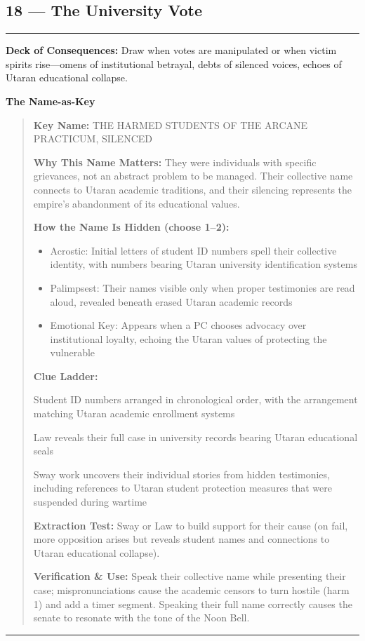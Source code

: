 \documentclass[18pt, letterpaper, twoside]{article}
\newenvironment{floorbox}[1]{%
    \begin{center}
    \begin{minipage}{0.95\textwidth}
    \subsection*{#1}
    \vspace{-0.5em}
    \rule{\textwidth}{0.5pt}
    \vspace{0.5em}
}{%
    \vspace{0.5em}
    \rule{\textwidth}{0.5pt}
    \end{minipage}
    \end{center}
}
\newenvironment{gmnote}[1]{%
    \vspace{0.5em}
    \noindent\textbf{#1}
    \begin{quote}
}{%
    \end{quote}
    \vspace{0.5em}
}
\newcommand{\deckdraw}[1]{\noindent\textbf{Deck of Consequences:} #1\par}
\newcommand{\keyname}[1]{\noindent\textbf{Key Name:} #1\par}
\newcommand{\nameimportance}[1]{\noindent\textbf{Why This Name Matters:} #1\par}
\begin{document}
\begin{floorbox}{18 --- The University Vote}
\deckdraw{Draw when votes are manipulated or when victim spirits rise---omens of institutional betrayal, debts of silenced voices, echoes of Utaran educational collapse.}

\begin{gmnote}{The Name-as-Key}
\keyname{THE HARMED STUDENTS OF THE ARCANE PRACTICUM, SILENCED}
\nameimportance{They were individuals with specific grievances, not an abstract problem to be managed. Their collective name connects to Utaran academic traditions, and their silencing represents the empire's abandonment of its educational values.}

\textbf{How the Name Is Hidden (choose 1--2):}
\begin{itemize}[leftmargin=*]
    \item Acrostic: Initial letters of student ID numbers spell their collective identity, with numbers bearing Utaran university identification systems
    \item Palimpsest: Their names visible only when proper testimonies are read aloud, revealed beneath erased Utaran academic records
    \item Emotional Key: Appears when a PC chooses advocacy over institutional loyalty, echoing the Utaran values of protecting the vulnerable
\end{itemize}

\textbf{Clue Ladder:}
\begin{description}[leftmargin=*, style=unboxed]
    \item[Gentle Nudge:] Student ID numbers arranged in chronological order, with the arrangement matching Utaran academic enrollment systems
    \item[Actionable Lead:] Law reveals their full case in university records bearing Utaran educational seals
    \item[Aha! Proof:] Sway work uncovers their individual stories from hidden testimonies, including references to Utaran student protection measures that were suspended during wartime
\end{description}

\textbf{Extraction Test:} Sway or Law to build support for their cause (on fail, more opposition arises but reveals student names and connections to Utaran educational collapse).

\textbf{Verification \& Use:} Speak their collective name while presenting their case; mispronunciations cause the academic censors to turn hostile (harm 1) and add a timer segment. Speaking their full name correctly causes the senate to resonate with the tone of the Noon Bell.
\end{gmnote}


\end{floorbox}
\end{document}
